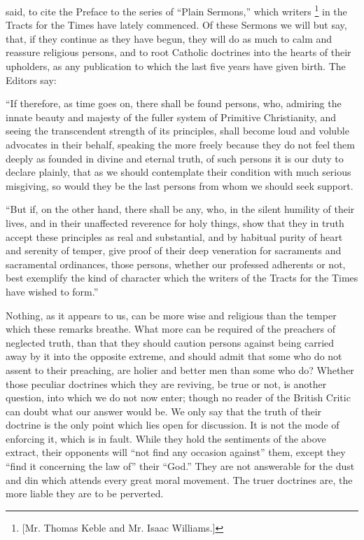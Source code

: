 said, to cite the Preface to the series of ``Plain Sermons,'' which
writers \footnote{[Mr. Thomas Keble and Mr. Isaac Williams.]} in the Tracts for
the Times have lately commenced. Of these Sermons we will but say,
that, if they continue as they have begun, they will do as much to
calm and reassure religious persons, and to root Catholic doctrines
into the hearts of their upholders, as any publication to which the
last five years have given birth. The Editors say:

``If
therefore, as time goes on, there shall be found persons, who,
admiring the innate beauty and majesty of the fuller system of
Primitive Christianity, and seeing the transcendent strength of its
principles, shall become loud and voluble advocates in their behalf,
speaking the more freely because they do not feel them deeply as
founded in divine and eternal truth, of such persons it is our duty to
declare plainly, that as we should contemplate their condition with
much serious misgiving, so would they be the last persons from whom we
should seek support.

``But
if, on the other hand, there shall be any, who, in the silent humility
of their lives, and in their unaffected reverence for holy things,
show that they in truth accept these principles as real and
substantial, and by habitual purity of heart and serenity of temper,
give proof of their deep veneration for sacraments and sacramental
ordinances, those persons, whether our professed adherents or not,
best exemplify the kind of character which the writers of the Tracts
for the Times have wished to form.''

Nothing, as it appears to us, can be more wise
and religious than the temper which these remarks breathe. What more
can be required of the preachers of neglected truth, than that they
should caution persons against being carried away by it into the
opposite extreme, and should admit that some who do not assent to
their preaching, are holier and better men than some who do? Whether
those peculiar doctrines which they are reviving, be true or not, is
another question, into which we do not now enter; though no reader of
the British Critic can doubt what our answer would be. We only say
that the truth of their doctrine is the only point which lies open for
discussion. It is not the mode of enforcing it, which is in fault.
While they hold the sentiments of the above extract, their opponents
will ``not find any occasion against'' them, except they ``find it
concerning the law of'' their ``God.'' They are not answerable for the
dust and din which attends every great moral movement. The truer
doctrines are, the more liable they are to be perverted.

